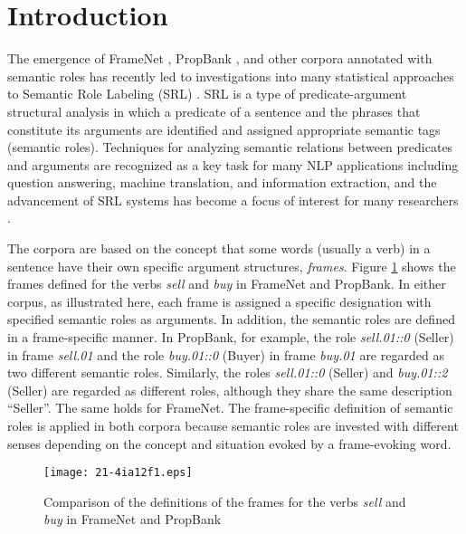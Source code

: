 \documentclass[english]{jnlp_1.4_rep}
\begin{document}
\maketitle

\section{Introduction}

The emergence of FrameNet \cite{Baker:98}, PropBank \cite{Palmer:05}, and other corpora annotated with semantic roles has recently led to investigations into many statistical approaches to Semantic Role Labeling (SRL) \cite{marquez2008srl}. SRL is a type of predicate-argument structural analysis in which a predicate of a sentence and the phrases that constitute its arguments are identified and assigned appropriate semantic tags (semantic roles). Techniques for analyzing semantic relations between predicates and arguments are recognized as a key task for many NLP applications including question answering, machine translation, and information extraction, and the advancement of SRL systems has become a focus of interest for many researchers \cite{narayanan-harabagiu:2004:COLING,shen-lapata:2007:EMNLP-CoNLL2007,moschitti2007esa,Surdeanu2003}.

The corpora are based on the concept that some words (usually a verb) in a sentence have their own specific argument structures, {\it frames}. Figure \ref{framenet-propbank} shows the frames defined for the verbs {\it sell} and {\it buy} in FrameNet and PropBank. In either corpus, as illustrated here, each frame is assigned a specific designation with specified semantic roles as arguments. In addition, the semantic roles are defined in a frame-specific manner. In PropBank, for example, the role {\it sell.01::0} (Seller) in frame {\it sell.01} and the role {\it buy.01::0} (Buyer) in frame {\it buy.01} are regarded as two different semantic roles. Similarly, the roles {\it sell.01::0} (Seller) and {\it buy.01::2} (Seller) are regarded as different roles, although they share the same description ``Seller''. The same holds for FrameNet. The frame-specific definition of semantic roles is applied in both corpora because semantic roles are invested with different senses depending on the concept and situation evoked by a frame-evoking word.

\begin{figure}[b]
\begin{center}
\texttt{[image: 21-4ia12f1.eps]}
\end{center}
\caption{Comparison of the definitions of the frames for the verbs {\it sell} and {\it buy} in FrameNet and PropBank}
\label{framenet-propbank}
\end{figure}
\end{document}
